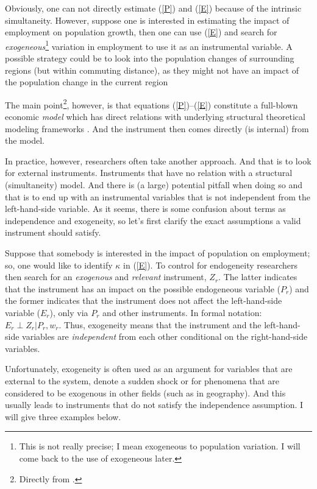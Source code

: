 \documentclass[fleqn,10pt]{SelfArx} %
\begin{document}
Obviously, one can not directly estimate (\ref{P}) and (\ref{E}) because of the
intrinsic simultaneity. However, suppose one is interested in estimating the
impact of employment on population growth, then one can use (\ref{E}) and search
for \emph{exogeneous}\footnote{This is not really precise; I mean exogeneous to
  population variation. I will come back to the use of exogeneous later.} variation in employment to use it as an instrumental
variable. A possible strategy could be to look into the population changes of
surrounding regions (but within commuting distance), as they might not have an
impact of the population change in the current region
\citep[see][]{DeGraaff2012, Graaff2012}

The main point\footnote{Directly from \cite{deaton2010instruments}.},
however, is that equations (\ref{P})--(\ref{E}) constitute a full-blown
economic \emph{model} which has direct relations with underlying structural
theoretical modeling frameworks \citep[such as][]{roback1982wages}. And the
instrument then comes directly (is internal) from the model. 

In practice, however, researchers often take another approach. And that is to
look for external instruments. Instruments that have no relation with a
structural (simultaneity) model. And there is (a large) potential pitfall when doing so
and that is to end up with an instrumental variables that is not independent from
the left-hand-side variable. As it seems, there is some confusion about terms as
independence and exogeneity, so let's first clarify the exact assumptions a
valid instrument should satisfy.

Suppose that somebody is interested in the impact of population on employment; so, one would like to
identify $\kappa$ in (\ref{E}). To control for endogeneity researchers then
search for an \emph{exogenous} and \emph{relevant} instrument, $Z_r$. The latter
indicates that the instrument has an impact on the possible endogeneous variable
($P_r$) and the former indicates that the instrument does not affect the
left-hand-side variable ($E_r$), only via $P_r$ and other instruments. In formal
notation: $E_r \perp Z_r|P_r, w_r$. Thus, exogeneity means that the instrument
and the left-hand-side variables are \emph{independent} from each other conditional on
the right-hand-side variables.

Unfortunately, exogeneity is often used as an argument for variables that are
external to the system, denote a sudden shock or for phenomena that are
considered to be exogenous in other fields (such as in geography).
And this usually leads to instruments that do not satisfy the
independence assumption. I will give three examples below.
\end{document}
